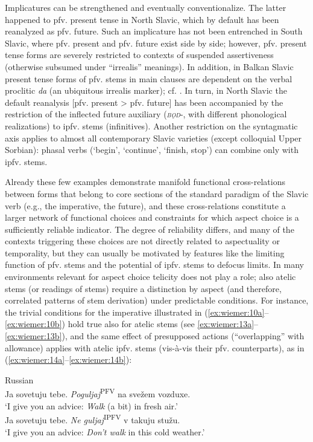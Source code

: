 \documentclass[output=paper]{langscibook}
\begin{document}
Implicatures can be strengthened and eventually conventionalize. The latter happened to pfv. present tense in North Slavic, which by default has been reanalyzed as pfv. future. Such an implicature has not been entrenched in South Slavic, where pfv. present and pfv. future exist side by side; however, pfv. present tense forms are severely restricted to contexts of suspended assertiveness (otherwise subsumed under ``irrealis'' meanings). In addition, in Balkan Slavic present tense forms of pfv. stems in main clauses are dependent on the verbal proclitic \textit{da} (an ubiquitous irrealis marker); cf. \citet{Ivanova2014a, Wiemer2014, Todorović2015}. In turn, in North Slavic the default reanalysis [pfv. present > pfv. future] has been accompanied by the restriction of the inflected future auxiliary (\textsc{\textit{bǫd}}{}-, with different phonological realizations) to ipfv. stems (infinitives). Another restriction on the syntagmatic axis applies to almost all contemporary Slavic varieties (except colloquial Upper Sorbian): phasal verbs (‘begin’, ‘continue’, ‘finish, stop’) can combine only with ipfv. stems.

Already these few examples demonstrate manifold functional cross-relations between forms that belong to core sections of the standard paradigm of the Slavic verb (e.g., the imperative, the future), and these cross-relations constitute a larger network of functional choices and constraints for which aspect choice is a sufficiently reliable indicator. The degree of reliability differs, and many of the contexts triggering these choices are not directly related to aspectuality or temporality, but they can usually be motivated by features like the limiting function of pfv. stems and the potential of ipfv. stems to defocus limits. In many environments relevant for aspect choice telicity does not play a role; also atelic stems (or readings of stems) require a distinction by aspect (and therefore, correlated patterns of stem derivation) under predictable conditions. For instance, the trivial conditions for the imperative illustrated in (\ref{ex:wiemer:10a}--\ref{ex:wiemer:10b}) hold true also for atelic stems (see \ref{ex:wiemer:13a}--\ref{ex:wiemer:13b}), and the same effect of presupposed actions (“overlapping” with allowance) applies with atelic ipfv. stems (vis-à-vis their pfv. counterparts), as in (\ref{ex:wiemer:14a}--\ref{ex:wiemer:14b}):

\ea 
{Russian} \\ 
\ea Ja sovetuju tebe. \textit{Poguljaj}\textsuperscript{PFV} na svežem vozduxe.\\ 
    \glt ‘I give you an advice: \textit{Walk} (a bit) in fresh air.’ \label{ex:wiemer:13a} \\
\ex \label{ex:wiemer:13b}  Ja sovetuju tebe. \textit{Ne guljaj}\textsuperscript{IPFV} v takuju stužu.\\
    \glt ‘I give you an advice: \textit{Don’t walk} in this cold weather.’\\    
\z\z
\end{document}
